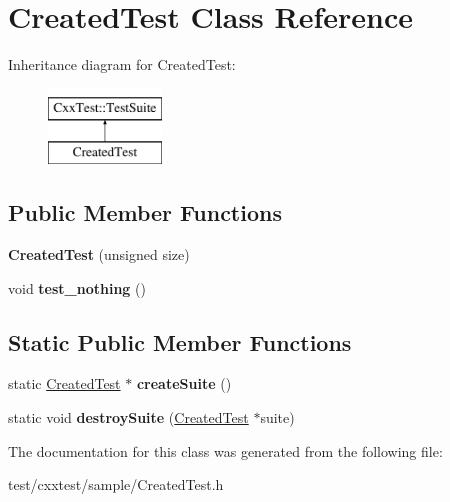 \hypertarget{classCreatedTest}{\section{Created\-Test Class Reference}
\label{classCreatedTest}
}
Inheritance diagram for Created\-Test\-:\begin{figure}[H]
\begin{center}
\leavevmode
\includegraphics[height=2.000000cm]{classCreatedTest}
\end{center}
\end{figure}
\subsection*{Public Member Functions}
\begin{DoxyCompactItemize}
\item 
\hypertarget{classCreatedTest_a9ce6d9d079f3de3aab2807782179d432}{{\bfseries Created\-Test} (unsigned size)}\label{classCreatedTest_a9ce6d9d079f3de3aab2807782179d432}

\item 
\hypertarget{classCreatedTest_a47e025f3283e39f4b6ab065421ce1015}{void {\bfseries test\-\_\-nothing} ()}\label{classCreatedTest_a47e025f3283e39f4b6ab065421ce1015}

\end{DoxyCompactItemize}
\subsection*{Static Public Member Functions}
\begin{DoxyCompactItemize}
\item 
\hypertarget{classCreatedTest_a0842342004b65920648fc10a0b44cf2e}{static \hyperlink{classCreatedTest}{Created\-Test} $\ast$ {\bfseries create\-Suite} ()}\label{classCreatedTest_a0842342004b65920648fc10a0b44cf2e}

\item 
\hypertarget{classCreatedTest_aec7b74ca3ff8c6001a65a9dc13aed9ed}{static void {\bfseries destroy\-Suite} (\hyperlink{classCreatedTest}{Created\-Test} $\ast$suite)}\label{classCreatedTest_aec7b74ca3ff8c6001a65a9dc13aed9ed}

\end{DoxyCompactItemize}


The documentation for this class was generated from the following file\-:\begin{DoxyCompactItemize}
\item 
test/cxxtest/sample/Created\-Test.\-h\end{DoxyCompactItemize}
